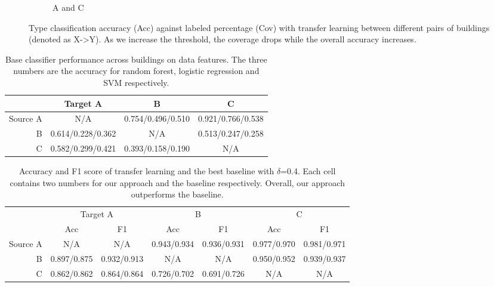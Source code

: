\begin{figure}[ht!]
\begin{subfigure}{0.32\textwidth}
                \caption{A and C}
  \end{subfigure}
\caption{Type classification accuracy (Acc) against labeled percentage (Cov) with transfer learning between different pairs of buildings (denoted as X->Y). As we increase the threshold, the coverage drops while the overall accuracy increases. }
\label{fig:tl_acc}
\end{figure}


\begin{table}[]
\centering
\begin{tabular}{r|c|c|c}
\hline
 & Target A     & B     & C     \\ \hline
Source A & N/A   & 0.754/0.496/0.510 & 0.921/0.766/0.538 \\ \hline
B & 0.614/0.228/0.362 & N/A   & 0.513/0.247/0.258 \\ \hline
C & 0.582/0.299/0.421 & 0.393/0.158/0.190 & N/A   \\ \hline
\end{tabular}
\caption{Base classifier performance across buildings on data features. The three numbers are the accuracy for random forest, logistic regression and SVM respectively.}
\label{acc_base}
\end{table}

\begin{table}[]
\centering
\begin{tabular}{r|c|c|c|c|c|c}
\hline
\multirow{2}{*}{} & \multicolumn{2}{c|}{Target A} & \multicolumn{2}{c|}{B} & \multicolumn{2}{c}{C} \\ \cline{2-7} 
                  & Acc        & F1        & Acc        & F1        & Acc        & F1        \\ \hline
Source A                 & N/A      & N/A     & 0.943/0.934      & 0.936/0.931     & 0.977/0.970      & 0.981/0.971     \\ \hline
B                 & 0.897/0.875     & 0.932/0.913     & N/A      & N/A     & 0.950/0.952      & 0.939/0.937     \\ \hline
C                 & 0.862/0.862     & 0.864/0.864     & 0.726/0.702      & 0.691/0.726     & N/A     & N/A     \\ \hline
\end{tabular}
\caption{Accuracy and F1 score of transfer learning and the best baseline with $\delta$=0.4. Each cell contains two numbers for our approach and the baseline respectively. Overall, our approach outperforms the baseline.}
\label{table:f1}
\end{table}

